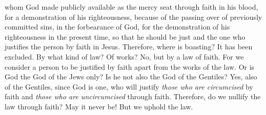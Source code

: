 \begin{biblechapter}
\verse whom God made publicly available as the mercy seat through faith in his blood, for a demonstration of his righteousness, because of the passing over of previously committed sins,
\verse in the forbearance of God, for the demonstration of his righteousness in the present time, so that he should be just and the one who justifies the person by faith in Jesus.
\verse Therefore, where is boasting? It has been excluded. By what kind of law? Of works? No, but by a law of faith.
\verse For we consider a person to be justified by faith apart from the works of the law.
\verse Or is God the God of the Jews only? Is he not also the God of the Gentiles? Yes, also of the Gentiles,
\verse since God is one, who will justify \textit{those who are circumcised} by faith and \textit{those who are uncircumcised} through faith.
\verse Therefore, do we nullify the law through faith? May it never be! But we uphold the law.
\end{biblechapter}

